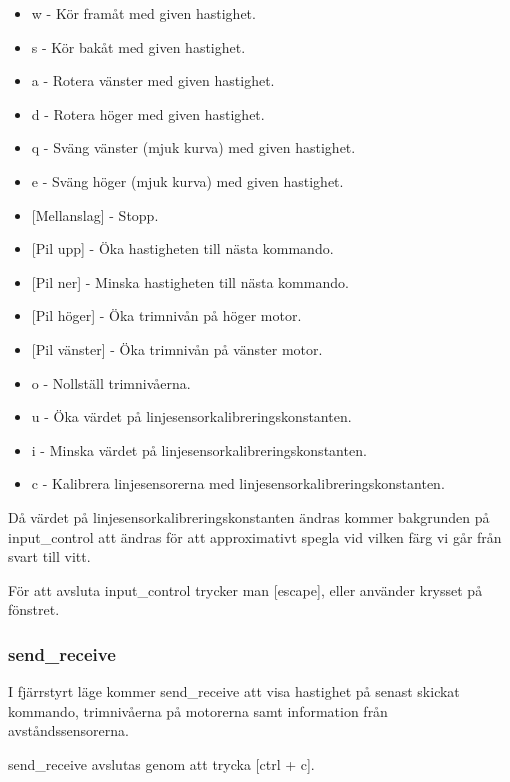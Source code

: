 \begin{itemize}
\item w - Kör framåt med given hastighet.
\item s - Kör bakåt med given hastighet.
\item a - Rotera vänster med given hastighet.
\item d - Rotera höger med given hastighet.
\item q - Sväng vänster (mjuk kurva) med given hastighet.
\item e - Sväng höger (mjuk kurva) med given hastighet.
\item {[}Mellanslag] - Stopp.

\item {[}Pil upp] - Öka hastigheten till nästa kommando.
\item {[}Pil ner] - Minska hastigheten till nästa kommando.

\item {[}Pil höger] - Öka trimnivån på höger motor.
\item {[}Pil vänster] - Öka trimnivån på vänster motor.
\item o - Nollställ trimnivåerna.

\item u - Öka värdet på linjesensorkalibreringskonstanten.
\item i - Minska värdet på linjesensorkalibreringskonstanten.
\item c - Kalibrera linjesensorerna med linjesensorkalibreringskonstanten.
\end{itemize}
Då värdet på linjesensorkalibreringskonstanten ändras kommer bakgrunden på
input\_control att ändras för att approximativt spegla vid vilken färg vi går
från svart till vitt.

För att avsluta input\_control trycker man [escape], eller använder krysset på
fönstret.

\subsubsection{send\_receive}
I fjärrstyrt läge kommer send\_receive att visa hastighet på senast skickat
kommando, trimnivåerna på motorerna samt information från avståndssensorerna.

send\_receive avslutas genom att trycka [ctrl + c].

